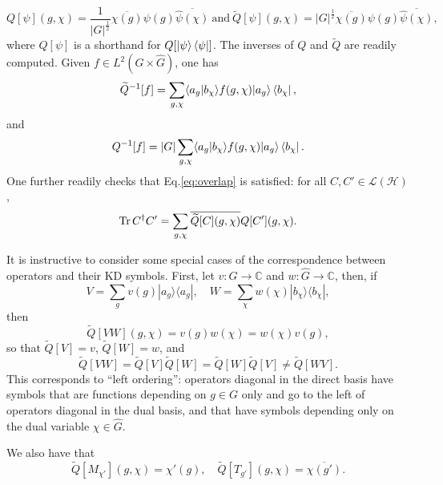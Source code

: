 \documentclass[a4paper, notitlepage, 11pt]{article}
\numberwithin{equation}{section}
\newcommand{\cket}[1]{|#1\rangle}
\newcommand{\bracket}[2]{\langle #1 | #2\rangle}
\newcommand{\mcl}[1]{\ensuremath{\mathcal{#1}}}
\newcommand{\Hcal}{{\mcl H}}
\newcommand{\C}{\ensuremath{\mathbb{C}}}
\newcommand{\card}[1]{\left|#1\right|}
\begin{document}
\begin{equation}\label{eq:KDsymbPure}
    Q[\psi](g,\chi) = \frac{1}{\card{G}^{\frac{1}{2}}}\overline{\chi(g)}\psi(g)\overline{\widehat{\psi}(\chi)} \mathrm{\ and \ } \widetilde{Q}[\psi](g,\chi) = \card{G}^{\frac{1}{2}}\overline{\chi(g)}\psi(g)\overline{\widehat{\psi}(\chi)},
\end{equation}
where $Q[\psi]$ is a shorthand for $Q[\cket{\psi}\bra{\psi}]$.
The inverses of $Q$ and $\widetilde{Q}$ are readily computed. Given $f\in L^2(G\times \hat G)$, one has
\begin{equation}
\widetilde{Q}^{-1}[f]=\sum_{g,\chi} \bracket{a_g}{b_\chi} f(g,\chi) \cket{a_g}\bra{b_\chi},
\end{equation}
and
\begin{equation}
Q^{-1}[f]=\card{G} \sum_{g,\chi} \bracket{a_g}{b_\chi} f(g,\chi) \cket{a_g}\bra{b_\chi}.
\end{equation}
One further readily checks that Eq.\eqref{eq:overlap} is satisfied: for all $C, C'\in\mathcal L(\Hcal)$,
\begin{equation}\label{eq:Overlap}
\Tr C^{\dagger}C'=\sum_{g, \chi} \overline{\widetilde{Q}[C](g,\chi)} Q[C'](g,\chi).
\end{equation}

It is instructive to consider some special cases of the correspondence between operators and their KD symbols. First, let $v:G\to\C$ and $w:\widehat G\to \C$, then, if 
\begin{equation}
V=\sum_g v(g) |a_g\rangle\langle a_g|,\quad W=\sum_{\chi} w(\chi)|b_\chi\rangle\langle b_\chi|,
\end{equation}
then
\begin{equation}\label{eq:ordering1}
   \widetilde{Q}[VW](g,\chi)=v(g)w(\chi)=w(\chi)v(g),
\end{equation}
so that 
$\widetilde{Q}[V]=v$, $\widetilde{Q}[W]=w$, and 
\begin{equation}\label{eq:ordering2}
\widetilde{Q}[VW]=\widetilde{Q}[V]\widetilde{Q}[W]=\widetilde{Q}[W]\widetilde{Q}[V]\not=\widetilde{Q}[WV].
\end{equation}
This corresponds to ``left ordering'': operators diagonal in the direct basis have symbols that are functions depending on $g\in G$ only and go to the left of operators diagonal in the dual basis, and that have symbols depending only on the dual variable $\chi\in\hat G$. 

We also have that
\begin{equation}
    \widetilde{Q}[M_{\chi'}](g,\chi)=\chi'(g), \quad \widetilde{Q}[T_{g'}](g,\chi)=\overline{\chi(g')}.
\end{equation}
\end{document}
